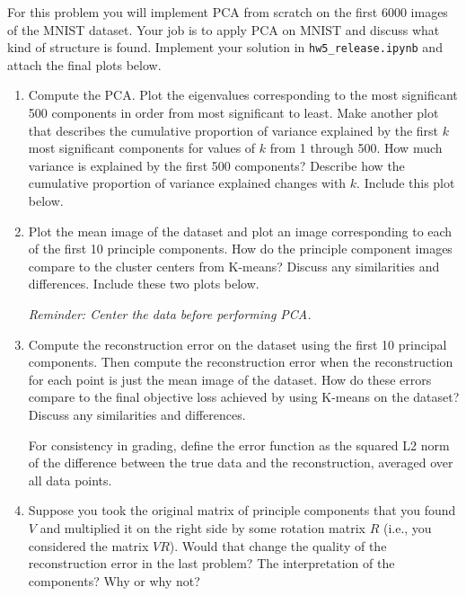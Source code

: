 \documentclass[submit]{harvardml}
\begin{document}
\begin{problem}[PCA]

  For this problem you will implement PCA from scratch on the first 6000 images of the MNIST dataset. Your job is to apply PCA on MNIST and discuss what kind of structure is found. Implement your solution in \texttt{hw5\_release.ipynb} and attach the final plots below. \\

  \begin{enumerate}

    \item Compute the PCA. Plot the eigenvalues corresponding to the most
    significant 500 components in order from most significant to
    least. Make another plot that describes the cumulative proportion of
    variance explained by the first $k$ most significant components for
    values of $k$ from 1 through 500.  How much variance is explained by
    the first 500 components?  Describe how the cumulative proportion of
    variance explained changes with $k$.  Include this plot below.

    \item Plot the mean image of the dataset and plot an image
    corresponding to each of the first 10 principle components.  How do
    the principle component images compare to the cluster centers from
    K-means? Discuss any similarities and differences.  Include these
    two plots below.
    
    \textit{Reminder: Center the data before performing PCA.}

    \item Compute the reconstruction error on the dataset using the first 10 principal components. Then compute the reconstruction error when the reconstruction for each point is just the mean
    image of the dataset. How do these errors compare to
    the final objective loss achieved by using K-means on the dataset?
    Discuss any similarities and differences.

    For consistency in grading, define the error function as the squared L2
    norm of the difference between the true data and the reconstruction, averaged over all data points.
  
    \item Suppose you took the original matrix of principle components
    that you found $V$ and multiplied it on the right side by some rotation matrix $R$ (i.e., you considered the matrix $VR$).
    Would that change the quality of the reconstruction error in the
    last problem?  The interpretation of the components?  Why or why
    not?

  \end{enumerate}
\end{problem}
\end{document}
